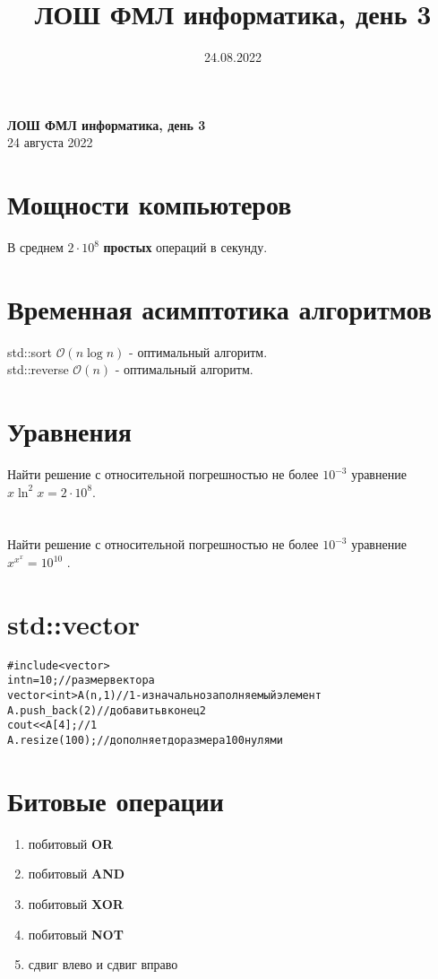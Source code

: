 \documentclass[10pt]{article}
\title{ЛОШ ФМЛ информатика, день 3}
\date{24.08.2022}
\begin{document}
\begin{center}
    \Large
    \textbf{ЛОШ ФМЛ информатика, день 3}
    \vspace{0.4cm}
    \large
    \\
    24 августа 2022
\end{center}
    \section{Мощности компьютеров}
    В среднем $2 \cdot 10^8$ \textbf{простых} операций в секунду.
    
    \section{Временная асимптотика алгоритмов}
    std::sort $\mathcal{O}(n \log n)$ - оптимальный алгоритм.
    \\
    std::reverse $\mathcal{O}(n)$ - оптимальный алгоритм.
   
    \section{Уравнения}
    Найти решение с относительной погрешностью не более $10^{-3}$ уравнение $x \ln^2 x = 2 \cdot 10^8$.
    \\
    \\
    \\
    Найти решение с относительной погрешностью не более $10^{-3}$ уравнение  \Large $x ^ {x ^ x} = 10^{10}$ \normalsize.
    \\
    \section{std::vector}
    \begin{alltt}
#include<vector>
int n = 10; // размер вектора
vector<int> A(n , 1) // 1 - изначально заполняемый элемент
A.push_back(2) // добавить в конец 2
cout << A[4]; // 1
A.resize(100); // дополняет до размера 100 нулями 
    \end{alltt}
    \section{Битовые операции}
        \begin{enumerate} 
            \item побитовый \textbf{OR} 
            \item  побитовый \textbf{AND} 
            \item  побитовый \textbf{XOR}
            \item  побитовый \textbf{NOT}
            \item  сдвиг влево и сдвиг вправо
        \end{enumerate}
\end{document}
